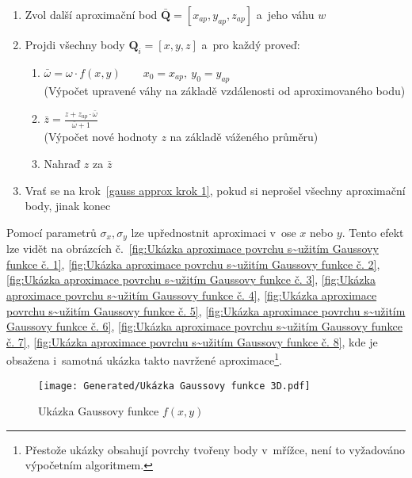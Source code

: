 \begin{enumerate}
    \item \label{gauss approx krok 1} Zvol další aproximační bod $\bar{\bm{Q}} = [x_{ap}, y_{ap}, z_{ap}]$ a~jeho váhu $w$
    \item Projdi všechny body $\bm{Q}_i = [x,y,z]$ a~pro každý proveď:
          \begin{enumerate}
              \item $\bar{\omega} = \omega \cdot f(x, y) \quad \quad x_0 = x_{ap},~y_0 = y_{ap}$\\
                    {\tiny{(Výpočet upravené váhy na základě vzdálenosti od aproximovaného bodu)}}
              \item $\bar{z} = \frac{z + z_{ap} \cdot \bar{\omega} }{\bar{\omega} + 1}$\\
                    {\tiny{(Výpočet nové hodnoty $z$ na základě váženého průměru)}}
              \item Nahraď $z$ za $\bar{z}$
          \end{enumerate}
    \item Vrať se na krok~\ref{gauss approx krok 1}, pokud si neprošel všechny
          aproximační body, jinak konec
\end{enumerate}
Pomocí parametrů $\sigma_x, \sigma_y$ lze upřednostnit aproximaci v~ose $x$ nebo $y$. Tento efekt lze vidět na obrázcích
č.~\ref{fig:Ukázka aproximace povrchu s~užitím Gaussovy funkce č. 1},
\ref{fig:Ukázka aproximace povrchu s~užitím Gaussovy funkce č. 2},
\ref{fig:Ukázka aproximace povrchu s~užitím Gaussovy funkce č. 3},
\ref{fig:Ukázka aproximace povrchu s~užitím Gaussovy funkce č. 4},
\ref{fig:Ukázka aproximace povrchu s~užitím Gaussovy funkce č. 5},
\ref{fig:Ukázka aproximace povrchu s~užitím Gaussovy funkce č. 6},
\ref{fig:Ukázka aproximace povrchu s~užitím Gaussovy funkce č. 7},
\ref{fig:Ukázka aproximace povrchu s~užitím Gaussovy funkce č. 8},
kde je obsažena i~samotná ukázka takto navržené aproximace\footnote{Přestože
    ukázky obsahují povrchy tvořeny body v~mřížce, není to vyžadováno výpočetním algoritmem.
}.
\begin{figure}[H]
    \centering
    \texttt{[image: Generated/Ukázka Gaussovy funkce 3D.pdf]}
    \caption{Ukázka Gaussovy funkce $f(x,y)$}
    \label{fig:Ukázka Gaussovy funkce 3D}
\end{figure}
